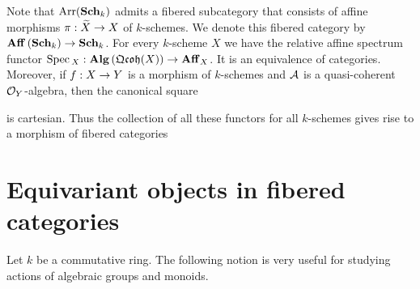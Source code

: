 \begin{remark}\label{remark:from_qc_algebras_to_the_category_of_arrows_over_schemes}
Note that $\mathrm{Arr}(\mathbf{Sch}_k)$ admits a fibered subcategory that consists of affine morphisms $\pi:\widetilde{X}\rightarrow X$ of $k$-schemes. We denote this fibered category by $\mathbf{Aff}\left(\mathbf{Sch}_k\right)\rightarrow \mathbf{Sch}_k$. For every $k$-scheme $X$ we have the relative affine spectrum functor $\mathrm{Spec}\,_X:\mathbf{Alg}\left(\mathfrak{Qcoh}(X)\right)\rightarrow \mathbf{Aff}_X$. It is an equivalence of categories. Moreover, if $f:X\rightarrow Y$ is a morphism of $k$-schemes and ${\mathcal A}$ is a quasi-coherent ${\mathcal O}_Y$-algebra, then the canonical square
\begin{center}
\end{center}
is cartesian. Thus the collection of all these functors for all $k$-schemes gives rise to a morphism of fibered categories
\begin{center}
\end{center}
\end{remark}

\section{Equivariant objects in fibered categories}
\noindent
Let $k$ be a commutative ring. The following notion is very useful for studying actions of algebraic groups and monoids.


